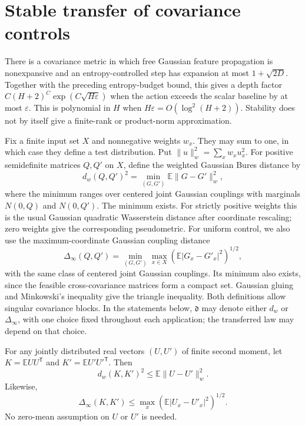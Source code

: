 \section{Stable transfer of covariance controls}
\label{sec:critical-bures-transfer}

There is a covariance metric in which free Gaussian feature propagation
is nonexpansive and an entropy-controlled step has expansion at most
$1+\sqrt{2D}$. Together with the preceding entropy-budget bound, this
gives a depth factor $C(H+2)^C\exp(C\sqrt{H\varepsilon})$ when the
action exceeds the scalar baseline by at most $\varepsilon$.
This is polynomial in $H$ when $H\varepsilon=O(\log^2(H+2))$.
Stability does not by itself give a finite-rank or product-norm
approximation.

Fix a finite input set $X$ and nonnegative weights $w_x$. They may sum
to one, in which case they define a test distribution. Put
$\|u\|_w^2=\sum_xw_xu_x^2$. For positive semidefinite matrices
$Q,Q'$ on $X$, define the weighted Gaussian Bures distance by
\[
 d_w(Q,Q')^2=\min_{(G,G')}\mathbb E\|G-G'\|_w^2,
\]
where the minimum ranges over centered joint Gaussian couplings with
marginals $N(0,Q)$ and $N(0,Q')$. The minimum exists. For strictly positive weights this is the usual
Gaussian quadratic Wasserstein distance after coordinate rescaling;
zero weights give the corresponding pseudometric. For uniform control,
we also use the maximum-coordinate Gaussian coupling distance
\[
 \Delta_\infty(Q,Q')=
 \min_{(G,G')}\max_{x\in X}
       (\mathbb E|G_x-G'_x|^2)^{1/2},
\]
with the same class of centered joint Gaussian couplings. Its minimum
also exists, since the feasible cross-covariance matrices form a compact
set. Gaussian gluing and Minkowski's inequality give the triangle
inequality. Both definitions allow singular covariance blocks. In the
statements below, $\mathfrak d$ may denote either $d_w$ or
$\Delta_\infty$, with one choice fixed throughout each application;
the transferred law may depend on that choice.

\begin{lemma}
\label{lem:critical-second-moment-coupling}
For any jointly distributed real vectors $(U,U')$ of finite second
moment, let $K=\mathbb E UU^{\mathsf T}$ and
$K'=\mathbb E U'U'^{\mathsf T}$. Then
\[
 d_w(K,K')^2\le\mathbb E\|U-U'\|_w^2.
\]
Likewise,
\[
 \Delta_\infty(K,K')\le
 \max_x(\mathbb E|U_x-U'_x|^2)^{1/2}.
\]
No zero-mean assumption on $U$ or $U'$ is needed.
\end{lemma}

